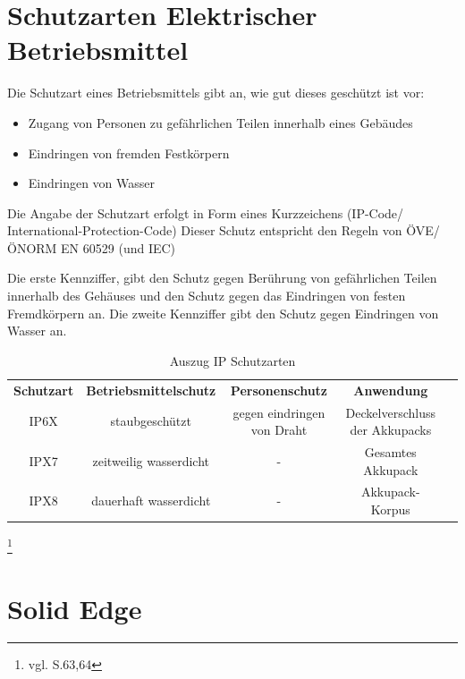 \newpage

\section{Schutzarten Elektrischer Betriebsmittel} 

Die Schutzart eines Betriebsmittels gibt an, wie gut dieses geschützt ist vor:
\begin{itemize}
	\item Zugang von Personen zu gefährlichen Teilen innerhalb eines Gebäudes
	\item Eindringen von fremden Festkörpern
	\item Eindringen von Wasser
\end{itemize}
 
Die Angabe der Schutzart erfolgt in Form eines Kurzzeichens (IP-Code/ International-Protection-Code)
Dieser Schutz entspricht den Regeln von ÖVE/ÖNORM EN 60529 (und IEC)

Die erste Kennziffer, gibt den Schutz gegen Berührung von gefährlichen Teilen innerhalb des Gehäuses und den Schutz gegen das Eindringen von festen Fremdkörpern an.
Die zweite Kennziffer gibt den Schutz gegen Eindringen von Wasser an.

\begin{table}[H]
	\begin{tabular}{|c|c|c|c|l}
\cline{1-4}
		\textbf{Schutzart} & \textbf{Betriebsmittelschutz} & \textbf{Personenschutz}    & \textbf{Anwendung}             &  \\ \cline{1-4}
		IP6X               & staubgeschützt                & gegen eindringen von Draht & Deckelverschluss der Akkupacks &  \\ \cline{1-4}
		IPX7               & zeitweilig wasserdicht        & -                          & Gesamtes Akkupack              &  \\ \cline{1-4}
		IPX8               & dauerhaft wasserdicht         & -                          & Akkupack-Korpus                &  \\ \cline{1-4}
	\end{tabular}
	\caption{Auszug IP Schutzarten}
\end{table}

\footnote{vgl. \cite{IPSchutzarten} S.63,64}
\newpage

\section{Solid Edge}


